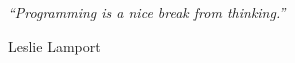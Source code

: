 \null\vfill
\textit{``Programming is a nice break from thinking.''}

\begin{flushright}
Leslie Lamport
\end{flushright}

\vfill\vfill\vfill\vfill\vfill\vfill\null
